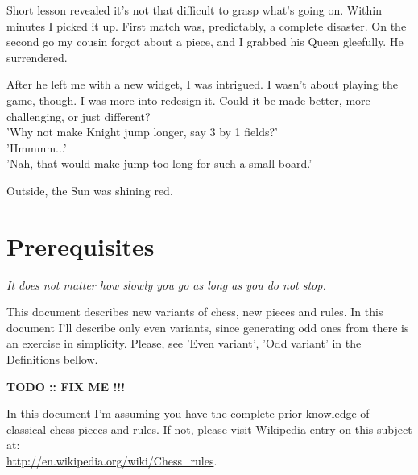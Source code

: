 \documentclass[a5paper,12pt,draft]{book} %
\begin{document}
Short lesson revealed it's not that difficult to grasp what's going
on. Within minutes I picked it up. First match was, predictably, a
complete disaster. On the second go my cousin forgot about a piece,
and I grabbed his Queen gleefully. He surrendered.

After he left me with a new widget, I was intrigued. I wasn't
about playing the game, though. I was more into redesign it. Could it
be made better, more challenging, or just different? \\
'Why not make Knight jump longer, say 3 by 1 fields?' \\
'Hmmmm...' \\
'Nah, that would make jump too long for such a small board.'

Outside, the Sun was shining red.
\clearpage

\chapter*{Prerequisites}

\begin{flushright}
\parbox{0.7\textwidth}{
\emph{It does not matter how slowly you go as long as you do not stop. \\
 } }
\end{flushright}

This document describes new variants of chess, new pieces
and rules. In this document I'll describe only even variants, since
generating odd ones from there is an exercise in simplicity. Please,
see 'Even variant', 'Odd variant' in the Definitions bellow.

\textbf{\huge{TODO :: FIX ME !!!}} %

In this document I'm assuming you have the complete prior
knowledge of classical chess pieces and rules. If not, please visit
Wikipedia entry on this subject at: \\
\href{http://en.wikipedia.org/wiki/Chess\_rules}{http://en.wikipedia.org/wiki/Chess\_rules}.
\clearpage

\end{document}
